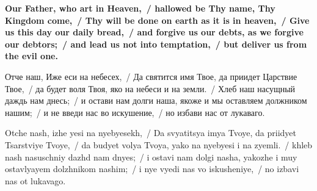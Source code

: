 {\LARGE \bfseries
Our Father, who art in Heaven,~/ hallowed be Thy name, Thy Kingdom come,~/ Thy will be done on earth as it is in heaven,~/ Give us this day our daily bread,~/ and forgive us our debts, as we forgive our debtors;~/ and lead us not into temptation,~/ but deliver us from the evil one.

\vspace{\fill}

Отче наш, Иже еси на небесех,~/ Да святится имя Твое, да приидет Царствие Твое,~/ да будет воля Твоя, яко на небеси и на земли.~/ Хлеб наш насущный даждь нам днесь;~/ и остави нам долги наша, якоже и мы оставляем должником нашим;~/ и не введи нас во искушение,~/ но избави нас от лукаваго.

\vspace{\fill}

Otche nash, izhe yesi na nyebyesekh,~/ Da svyatitsya imya Tvoye, da priidyet Tsarstviye Tvoye,~/ da budyet volya Tvoya, yako na nyebyesi i na zyemli.~/ khleb nash nasuschniy dazhd nam dnyes;~/ i ostavi nam dolgi nasha, yakozhe i muy ostavlyayem dolzhnikom nashim;~/ i nye vyedi nas vo iskusheniye,~/ no izbavi nas ot lukavago.}